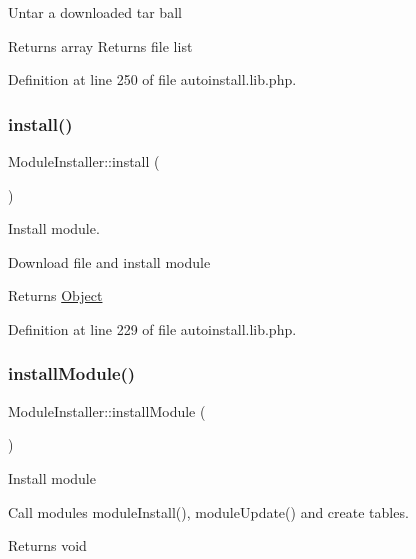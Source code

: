 Untar a downloaded tar ball

\begin{DoxyReturn}{Returns}
array Returns file list 
\end{DoxyReturn}


Definition at line 250 of file autoinstall.\+lib.\+php.

\mbox{\label{classModuleInstaller_aada761e2e31fc610bb69680991813bf8}} 
\subsubsection{\texorpdfstring{install()}{install()}}
{\footnotesize\ttfamily Module\+Installer\+::install (\begin{DoxyParamCaption}{ }\end{DoxyParamCaption})}

Install module.

Download file and install module

\begin{DoxyReturn}{Returns}
\hyperlink{classObject}{Object} 
\end{DoxyReturn}


Definition at line 229 of file autoinstall.\+lib.\+php.

\mbox{\label{classModuleInstaller_a07eb4b03dfd704124e05142cef5c9e82}} 
\subsubsection{\texorpdfstring{install\+Module()}{installModule()}}
{\footnotesize\ttfamily Module\+Installer\+::install\+Module (\begin{DoxyParamCaption}{ }\end{DoxyParamCaption})}

Install module

Call module\textquotesingle{}s module\+Install(), module\+Update() and create tables.

\begin{DoxyReturn}{Returns}
void 
\end{DoxyReturn}


